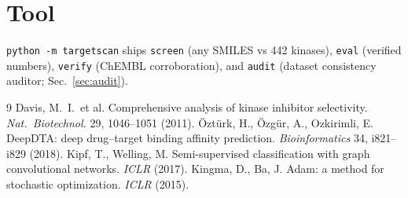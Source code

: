 \documentclass[11pt]{article}
\begin{document}
\section{Tool}
\texttt{python -m targetscan} ships \texttt{screen} (any SMILES vs 442
kinases), \texttt{eval} (verified numbers), \texttt{verify} (ChEMBL
corroboration), and \texttt{audit} (dataset consistency auditor;
Sec.~\ref{sec:audit}).
\begin{thebibliography}{9}
 Davis, M.~I.\ et al. Comprehensive analysis of kinase
inhibitor selectivity. \emph{Nat.\ Biotechnol.} 29, 1046--1051 (2011).
 \"Ozt\"urk, H., \"Ozg\"ur, A., Ozkirimli, E.
DeepDTA: deep drug--target binding affinity prediction.
\emph{Bioinformatics} 34, i821--i829 (2018).
 Kipf, T., Welling, M. Semi-supervised classification
with graph convolutional networks. \emph{ICLR} (2017).
 Kingma, D., Ba, J. Adam: a method for stochastic
optimization. \emph{ICLR} (2015).
\end{thebibliography}
\end{document}
